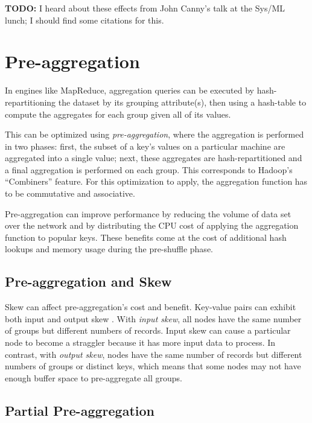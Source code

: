 \documentclass[12pt]{article}
\begin{document}
\textbf{TODO:} I heard about these effects from John Canny's talk at the Sys/ML lunch; I should find some citations for this.


\section{Pre-aggregation}

In engines like MapReduce, aggregation queries can be executed by
hash-repartitioning the dataset by its grouping attribute(s), then using
a hash-table to compute the aggregates for each group given all of its values.

This can be optimized using \emph{pre-aggregation}, where the aggregation is
performed in two phases: first, the subset of a key's values on a particular
machine are aggregated into a single value; next, these aggregates are
hash-repartitioned and a final aggregation is performed on each group.
This corresponds to Hadoop's ``Combiners'' feature.
For this optimization to apply, the aggregation function has to be commutative
and associative.

Pre-aggregation can improve performance by reducing the volume of data set
over the network and by distributing the CPU cost of applying the aggregation
function to popular keys.
These benefits come at the cost of additional hash lookups and memory usage
during the pre-shuffle phase.

\subsection{Pre-aggregation and Skew}

Skew can affect pre-aggregation's cost and benefit.  Key-value pairs can exhibit both input and output skew \cite{adaptive-aggregation}.
With \emph{input skew}, all nodes have the same number of groups but different numbers of records.  Input skew can cause a particular node to become a straggler because it has more input data to process.  In contrast, with \emph{output skew}, nodes have the same number of records but different numbers of groups or distinct keys, which means that some nodes may not have enough buffer space to pre-aggregate all groups.

\subsection{Partial Pre-aggregation}
\end{document}
